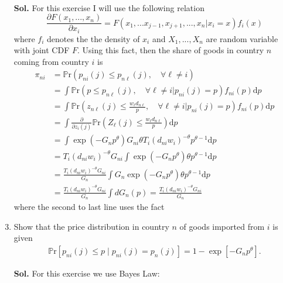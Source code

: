 \documentclass[12pt,oneside,reqno]{amsart}
\newcommand{\pr}{\mathbb{P}\mathrm{r}}
\begin{document}
\begin{enumerate}
\begin{align*}
    \end{align*}
    \item[\textbf{Sol.}] For this exercise I will use the following relation 
    \begin{equation*}
        \frac{\partial F(x_1,...,x_n)}{\partial x_i} = F(x_1,...x_{j-1},x_{j+1},...,x_n\vert x_i=x)f_i(x)
    \end{equation*}
    where $f_i$ denotes the the density of $x_i$ and $X_1,...,X_n$ are random variable with joint CDF $F$. Using this fact, then the share of goods in country $n$ coming from country $i$ is 
    \begin{align*}
        \pi_{ni} &= \pr\left(p_{ni}(j)\leq p_{n\ell}(j),\quad \forall\ell\neq i\right) \\ 
                 &= \int \pr\left(p\leq p_{n\ell}(j),\quad \forall\ell\neq i\Big\vert p_{ni}(j) = p\right)f_{ni}(p)\mathrm{d}p \\
                 &= \int \pr\left(z_{n\ell}(j)\leq \frac{w_\ell d_{n\ell}}{p},\quad \forall\ell\neq i\Big\vert p_{ni}(j) = p\right)f_{ni}(p)\mathrm{d}p \\ 
                 &= \int \frac{\partial}{\partial z_{i}(j)}\pr\left(Z_\ell(j) \leq \frac{w_\ell d_{n\ell}}{p}\right) \mathrm{d}p \\ 
                 &= \int \exp\left(-G_np^{\theta}\right)G_{ni}\theta T_i\left(d_{ni}w_i\right)^{-\theta} p^{\theta-1}\mathrm{d}p \\
                 &= T_i\left(d_{ni}w_i\right)^{-\theta}G_{ni}\int \exp\left(-G_np^{\theta}\right)\theta p^{\theta-1}\mathrm{d}p \\
                 &= \frac{T_i\left(d_{ni}w_i\right)^{-\theta}G_{ni}}{G_n}\int G_n\exp\left(-G_np^{\theta}\right)\theta p^{\theta-1}\mathrm{d}p \\ 
                 &= \frac{T_i\left(d_{ni}w_i\right)^{-\theta}G_{ni}}{G_n}\int dG_n(p)= \frac{T_i\left(d_{ni}w_i\right)^{-\theta}G_{ni}}{G_n}
    \end{align*}    
    where the second to last line uses the fact 
    \item Show that the price distribution in country $n$ of goods imported from $i$ is given
    \begin{align*}
        \pr\left[p_{n i}(j) \leq p \mid p_{n i}(j)=p_n(j)\right]=1-\exp \left[-G_n p^\theta\right] .
    \end{align*}
    \item[\textbf{Sol.}] For this exercise we use Bayes Law:
    \begin{align*}

\end{align*}
\end{enumerate}
\end{document}
